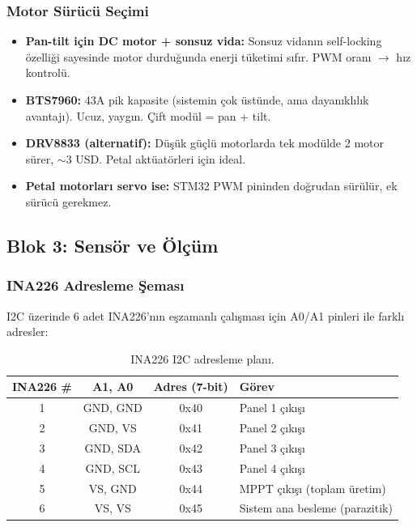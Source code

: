 \documentclass[11pt,a4paper]{article}
\begin{document}
\subsubsection{Motor Sürücü Seçimi}

\begin{itemize}
    \item \textbf{Pan-tilt için DC motor + sonsuz vida:} Sonsuz vidanın self-locking özelliği sayesinde motor durduğunda enerji tüketimi sıfır. PWM oranı $\rightarrow$ hız kontrolü.
    \item \textbf{BTS7960:} 43A pik kapasite (sistemin çok üstünde, ama dayanıklılık avantajı). Ucuz, yaygın. Çift modül = pan + tilt.
    \item \textbf{DRV8833 (alternatif):} Düşük güçlü motorlarda tek modülde 2 motor sürer, $\sim$3 USD. Petal aktüatörleri için ideal.
    \item \textbf{Petal motorları servo ise:} STM32 PWM pininden doğrudan sürülür, ek sürücü gerekmez.
\end{itemize}

\subsection{Blok 3: Sensör ve Ölçüm}

\subsubsection{INA226 Adresleme Şeması}

I2C üzerinde 6 adet INA226'nın eşzamanlı çalışması için A0/A1 pinleri ile farklı adresler:

\begin{table}[h]
\centering
\begin{tabular}{|c|c|c|p{6cm}|}
\hline
\rowcolor{primary!15}
\textbf{INA226 \#} & \textbf{A1, A0} & \textbf{Adres (7-bit)} & \textbf{Görev} \\
\hline
1 & GND, GND & 0x40 & Panel 1 çıkışı \\
2 & GND, VS  & 0x41 & Panel 2 çıkışı \\
3 & GND, SDA & 0x42 & Panel 3 çıkışı \\
4 & GND, SCL & 0x43 & Panel 4 çıkışı \\
5 & VS, GND  & 0x44 & MPPT çıkışı (toplam üretim) \\
6 & VS, VS   & 0x45 & Sistem ana besleme (parazitik) \\
\hline
\end{tabular}
\caption{INA226 I2C adresleme planı.}
\end{table}
\end{document}
